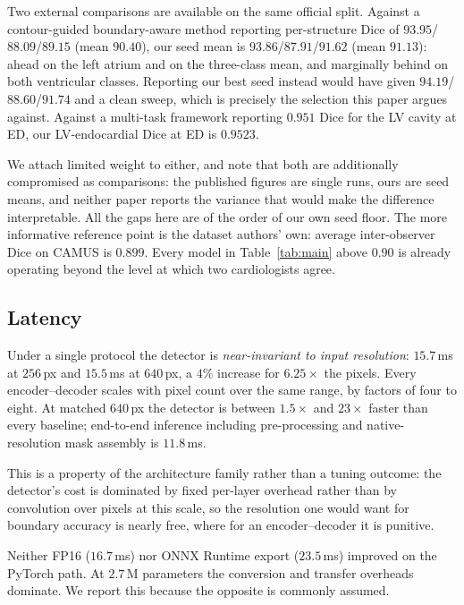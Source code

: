 Two external comparisons are available on the same official split. Against a
contour-guided boundary-aware method reporting per-structure Dice of
$93.95$/$88.09$/$89.15$ (mean $90.40$), our seed mean is
$93.86$/$87.91$/$91.62$ (mean $91.13$): ahead on the left atrium and on the
three-class mean, and marginally behind on both ventricular classes. Reporting
our best seed instead would have given $94.19$/$88.60$/$91.74$ and a clean sweep,
which is precisely the selection this paper argues against. Against a multi-task
framework reporting $0.951$ Dice for the LV cavity at ED, our LV-endocardial
Dice at ED is $0.9523$.

We attach limited weight to either, and note that both are additionally
compromised as comparisons: the published figures are single runs, ours are seed
means, and neither paper reports the variance that would make the difference
interpretable. All the gaps here are of the order of our own seed floor. The
more informative reference point is the dataset authors' own: average
inter-observer Dice on CAMUS is $0.899$. Every model in
Table~\ref{tab:main} above $0.90$ is already operating beyond the level at which
two cardiologists agree.

\subsection{Latency}



Under a single protocol the detector is \emph{near-invariant to input
resolution}: $15.7$\,ms at $256$\,px and $15.5$\,ms at $640$\,px, a $4\%$
increase for $6.25\times$ the pixels. Every encoder--decoder scales with pixel
count over the same range, by factors of four to eight. At matched $640$\,px the
detector is between $1.5\times$ and $23\times$ faster than every baseline;
end-to-end inference including pre-processing and native-resolution mask
assembly is $11.8$\,ms.

This is a property of the architecture family rather than a tuning outcome: the
detector's cost is dominated by fixed per-layer overhead rather than by
convolution over pixels at this scale, so the resolution one would want for
boundary accuracy is nearly free, where for an encoder--decoder it is punitive.

Neither FP16 ($16.7$\,ms) nor ONNX Runtime export ($23.5$\,ms) improved on the
PyTorch path. At $2.7$\,M parameters the conversion and transfer overheads
dominate. We report this because the opposite is commonly assumed.

